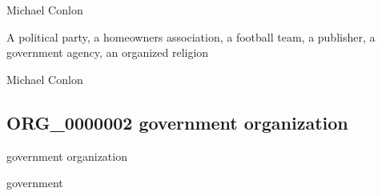 \documentclass[letterpaper,10pt,english]{sphinxmanual}
\begin{document}
\begin{sphinxShadowBox}

\sphinxAtStartPar
Michael Conlon 
\end{sphinxShadowBox}

\begin{sphinxShadowBox}

\sphinxAtStartPar
A political party, a homeowners association, a football team, a publisher, a government agency, an organized religion
\end{sphinxShadowBox}

\begin{sphinxShadowBox}

\sphinxAtStartPar
{}
\end{sphinxShadowBox}

\begin{sphinxShadowBox}

\sphinxAtStartPar
Michael Conlon 
\end{sphinxShadowBox}
\begin{quote}

\ignorespaces \end{quote}


\subsection{ORG\_0000002 \sphinxhyphen{} government organization}
\label{\detokenize{doc-ORG_0000002:org-0000002-government-organization}}\label{\detokenize{doc-ORG_0000002:index-0}}\label{\detokenize{doc-ORG_0000002::doc}}
\begin{sphinxShadowBox}

\sphinxAtStartPar
government organization
\end{sphinxShadowBox}

\begin{sphinxShadowBox}

\sphinxAtStartPar
government
\end{sphinxShadowBox}
\end{document}
